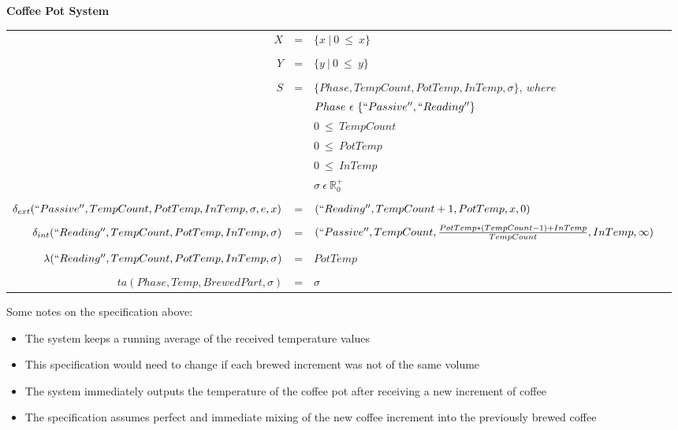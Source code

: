 \documentclass[10pt]{article}
\begin{document}
\textbf{Coffee Pot System}

\begin{footnotesize}
\begin{center}
  \begin{tabular}{r c l l}
    $X$ & = & $\{x~|~0~\leq~x\}$ \\
    \\
    $Y$ & = & $\{y~|~0~\leq~y\}$ \\
    \\
    $S$ & = & $\{Phase,TempCount,PotTemp,InTemp,\sigma\},~where$ \vspace{0.1cm}\\
    & & $Phase~\epsilon~\{``Passive'',``Reading''\}$ \vspace{0.1cm}\\
    & & $0~\leq~TempCount$ \vspace{0.1cm}\\
    & & $0~\leq~PotTemp$ \vspace{0.1cm}\\
    & & $0~\leq~InTemp$ \vspace{0.1cm}\\
    & & $\sigma~\epsilon~\mathbb{R}_{0}^{+}$ \\
    \\
    $\delta_{ext}(``Passive'',TempCount,PotTemp,InTemp,\sigma,e,x)$ & = & $(``Reading'',TempCount+1,PotTemp,x,0)$ \\
    \\
    $\delta_{int}(``Reading'',TempCount,PotTemp,InTemp,\sigma)$ & = & $(``Passive'',TempCount,\frac{PotTemp*(TempCount-1)+InTemp}{TempCount},InTemp,\infty)$ \\
    \\
    $\lambda(``Reading'',TempCount,PotTemp,InTemp,\sigma)$ & = & $PotTemp$ \\
    \\
    $ta(Phase,Temp,BrewedPart,\sigma)$ & = & $\sigma$ \\
  \end{tabular}
\end{center}
\end{footnotesize}

Some notes on the specification above:
\begin{itemize}
\item The system keeps a running average of the received temperature values
\item This specification would need to change if each brewed increment was not of the same volume
\item The system immediately outputs the temperature of the coffee pot after receiving a new increment of coffee
\item The specification assumes perfect and immediate mixing of the new coffee increment into the previously brewed coffee
\end{itemize}
  
\end{document}
